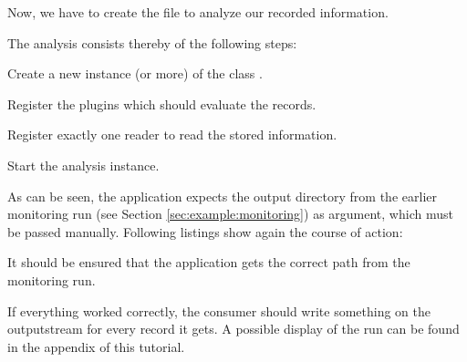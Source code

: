 \noindent Now, we have to create the file  to analyze our recorded information. 

The analysis consists thereby of the following steps:
\begin{compactenum}
\item Create a new instance (or more) of the class .
\item Register the plugins which should evaluate the records.
\item Register exactly one reader to read the stored information.
\item Start the analysis instance.
\end{compactenum}

\setJavaCodeListing       

As can be seen, the application expects the output directory from the earlier monitoring run (see Section \ref{sec:example:monitoring}) as argument, which must be passed manually. Following listings show again the course of action:
\setBashListing 		
	
	
It should be ensured that the application gets the correct path from the monitoring run. 

If everything worked correctly, the consumer should write something on the outputstream for every record it gets. A possible display of the run can be found in the appendix of this tutorial. 